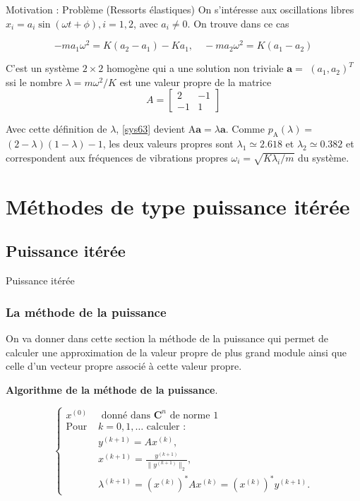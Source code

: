 \documentclass[french, 10pt]{beamer}
\theoremstyle{definition}
\begin{document}
\begin{frame}{Motivation : Problème (Ressorts élastiques)}
	On s'intéresse aux oscillations libres $x_i=a_i \sin (\omega t+\phi), i=1,2$, avec $a_i \neq 0$. On trouve dans ce cas
	
	\begin{equation}
		-m a_1 \omega^2=K\left(a_2-a_1\right)-K a_1, \quad-m a_2 \omega^2=K\left(a_1-a_2\right)
		\label{sys63}
	\end{equation}
	
	
	C'est un système $2 \times 2$ homogène qui a une solution non triviale $\mathbf{a}=$ $\left(a_1, a_2\right)^T$ ssi le nombre $\lambda=m \omega^2 / K$ est une valeur propre de la matrice
	$$
	A=\left[\begin{array}{rr}
		2 & -1 \\
		-1 & 1
	\end{array}\right]
	$$
	
	Avec cette définition de $\lambda$, \eqref{sys63} devient $\mathrm{A} \mathbf{a}=\lambda \mathbf{a}$. Comme $p_{\mathrm{A}}(\lambda)=$ $(2-\lambda)(1-\lambda)-1$, les deux valeurs propres sont $\lambda_1 \simeq 2.618$ et $\lambda_2 \simeq 0.382$ et correspondent aux fréquences de vibrations propres $\omega_i=\sqrt{K \lambda_i / m}$ du système.
\end{frame}

\section{Méthodes de type puissance itérée}
\subsection{Puissance itérée}

\begin{frame}{Puissance itérée}
\frametitle{La méthode de la puissance}

On va donner dans cette section la méthode de la puissance qui permet de calculer une approximation de la valeur propre de plus grand module ainsi que celle d’un vecteur propre associé à cette valeur propre.\\

\begin{center}
    \textbf{Algorithme de la méthode de la puissance}.
\end{center}

\begin{equation}
    \begin{cases}
    x^{(0)} & \text{ donné dans } \mathbf{C}^n \text{ de norme } 1 \\ 
    \text{Pour } & k=0,1, \ldots \text{ calculer :} \\ 
    & y^{(k+1)} = Ax^{(k)}, \\ 
    & x^{(k+1)} = \frac{y^{(k+1)}}{\| y^{(k+1)} \|_2}, \\ 
    & \lambda^{(k+1)} = (x^{(k)})^* Ax^{(k)} = (x^{(k)})^* y^{(k+1)}.
    \end{cases}
    \label{eq:1}
\end{equation}

\end{frame}
\end{document}
